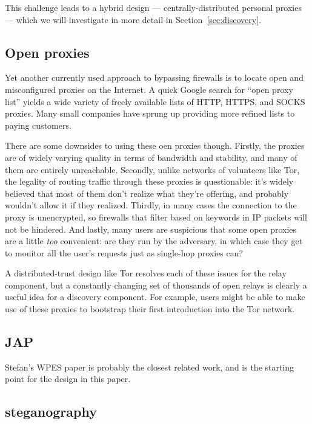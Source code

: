 \documentclass{llncs}
\begin{document}
This challenge leads to a hybrid design --- centrally-distributed
personal proxies --- which we will investigate in more detail in
Section~\ref{sec:discovery}.

\subsection{Open proxies}

Yet another currently used approach to bypassing firewalls is to locate
open and misconfigured proxies on the Internet. A quick Google search
for ``open proxy list'' yields a wide variety of freely available lists
of HTTP, HTTPS, and SOCKS proxies. Many small companies have sprung up
providing more refined lists to paying customers.

There are some downsides to using these oen proxies though. Firstly,
the proxies are of widely varying quality in terms of bandwidth and
stability, and many of them are entirely unreachable. Secondly, unlike
networks of volunteers like Tor, the legality of routing traffic through
these proxies is questionable: it's widely believed that most of them
don't realize what they're offering, and probably wouldn't allow it if
they realized. Thirdly, in many cases the connection to the proxy is
unencrypted, so firewalls that filter based on keywords in IP packets
will not be hindered. And lastly, many users are suspicious that some
open proxies are a little \emph{too} convenient: are they run by the
adversary, in which case they get to monitor all the user's requests
just as single-hop proxies can?

A distributed-trust design like Tor resolves each of these issues for
the relay component, but a constantly changing set of thousands of open
relays is clearly a useful idea for a discovery component. For example,
users might be able to make use of these proxies to bootstrap their
first introduction into the Tor network.

\subsection{JAP}

Stefan's WPES paper is probably the closest related work, and is
the starting point for the design in this paper.

\subsection{steganography}
\end{document}
